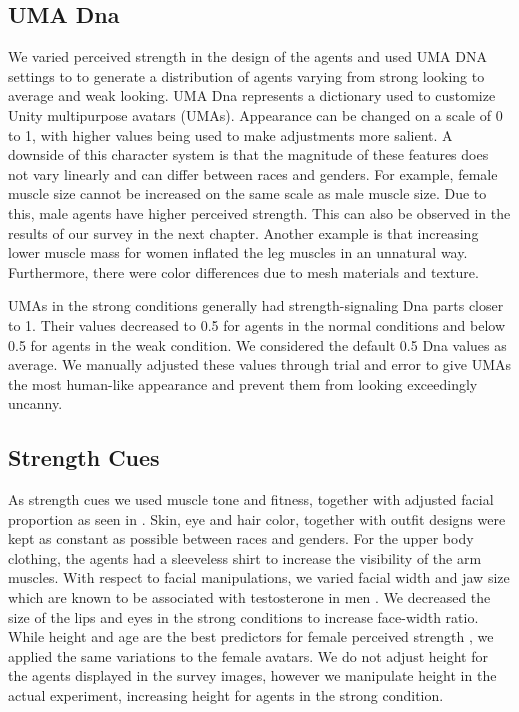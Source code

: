 \subsection{UMA Dna}
We varied perceived strength in the design of the agents and used UMA DNA settings to to generate a distribution of agents varying from strong looking to average and weak looking. UMA Dna represents a dictionary used to customize Unity multipurpose avatars (UMAs). Appearance can be changed on a scale of 0 to 1, with higher values being used to make adjustments more salient. A downside of this character system is that the magnitude of these features does not vary linearly and can differ between races and genders. For example, female muscle size cannot be increased on the same scale as male muscle size. Due to this, male agents have higher perceived strength. This can also be observed in the results of our survey in the next chapter. Another example is that increasing lower muscle mass for women inflated the leg muscles in an unnatural way. Furthermore, there were color differences due to mesh materials and texture. 

UMAs in the strong conditions generally had strength-signaling Dna parts closer to 1. Their values decreased to 0.5 for agents in the normal conditions and below 0.5 for agents in the weak condition. We considered the default 0.5 Dna values as average. We manually adjusted these values through trial and error to give UMAs the most human-like appearance and prevent them from looking exceedingly uncanny.    
\subsection{Strength Cues}
As strength cues we used muscle tone and fitness, together with adjusted facial proportion as seen in \cite{windhager2011geometric}. Skin, eye and hair color, together with outfit designs were kept as constant as possible between races and genders. For the upper body clothing, the agents had a sleeveless shirt to increase the visibility of the arm muscles. 
With respect to facial manipulations, we varied facial width and jaw size which are known to be associated with testosterone in men \cite{lefevre2013telling}. We decreased the size of the lips and eyes in the strong conditions to increase face-width ratio. While height and age are the best predictors for female perceived strength \cite{sell2008human}, we applied the same variations to the female avatars. We do not adjust height for the agents displayed in the survey images, however we manipulate height in the actual experiment, increasing height for agents in the strong condition.  

